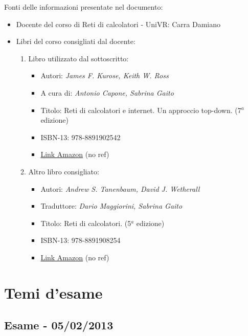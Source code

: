 \documentclass[a4paper]{article}
\begin{document}
	\noindent
	Fonti delle informazioni presentate nel documento:
	\begin{itemize}
		\item Docente del corso di \textsf{Reti di calcolatori} - UniVR: Carra Damiano
		
		\item Libri del corso consigliati dal docente:
		\begin{enumerate}
			\item Libro utilizzato dal sottoscritto:
			\begin{itemize}
				\item Autori: \emph{James F. Kurose, Keith W. Ross}
				\item A cura di: \emph{Antonio Capone, Sabrina Gaito}
				\item Titolo: \textsf{Reti di calcolatori e internet. Un approccio top-down. (7$^{a}$ edizione)}
				\item ISBN-13: 978-8891902542
				\item \href{https://amzn.eu/d/aVADZYD}{Link Amazon} (no ref)
			\end{itemize}
		
			\item Altro libro consigliato:
			\begin{itemize}
				\item Autori: \emph{Andrew S. Tanenbaum, David J. Wetherall}
				\item Traduttore: \emph{Dario Maggiorini, Sabrina Gaito}
				\item Titolo: \textsf{Reti di calcolatori. (5$^{a}$ edizione)}
				\item ISBN-13: 978-8891908254
				\item \href{https://amzn.eu/d/fC9FpsB}{Link Amazon} (no ref)
			\end{itemize}
		\end{enumerate}
	\end{itemize}\newpage
	
	\section{Temi d'esame}
	
	\subsection{Esame - 05/02/2013}
	
\end{document}
